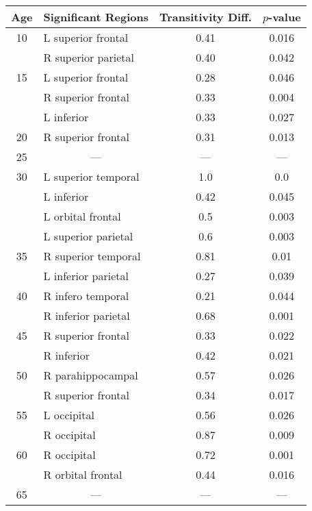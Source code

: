 \begin{table}[htb]
\centering
\begin{tabular}{c l c c}
\toprule
Age & \multicolumn{1}{c}{Significant Regions} & Transitivity Diff. & $p$-value\\
\midrule
\rowcolor{gray!40}
10 & L superior frontal & 0.41 & 0.016 \\
\rowcolor{gray!40}
{} & R superior parietal & 0.40 & 0.042 \\
\rowcolor{gray!20}
15 & L superior frontal & 0.28 & 0.046 \\
\rowcolor{gray!20}
{} & R superior frontal & 0.33 & 0.004 \\
\rowcolor{gray!20}
{} & L inferior & 0.33 & 0.027 \\
\rowcolor{gray!40}
20 & R superior frontal & 0.31 & 0.013 \\
\rowcolor{gray!20}
25 & \multicolumn{1}{c}{---} & --- & --- \\
\rowcolor{gray!40}
30 & L superior temporal & 1.0 & 0.0 \\
\rowcolor{gray!40}
{} & L inferior & 0.42 & 0.045 \\
\rowcolor{gray!40}
{} & L orbital frontal & 0.5 & 0.003 \\
\rowcolor{gray!40}
{} & L superior parietal & 0.6 & 0.003 \\
\rowcolor{gray!20}
35 & R superior temporal & 0.81 & 0.01 \\
\rowcolor{gray!20}
{} & L inferior parietal & 0.27 & 0.039 \\
\rowcolor{gray!40}
40 & R infero temporal & 0.21 & 0.044 \\
\rowcolor{gray!40}
{} & R inferior parietal & 0.68 & 0.001 \\
\rowcolor{gray!20}
45 & R superior frontal & 0.33 & 0.022 \\
\rowcolor{gray!20}
{} & R inferior & 0.42 & 0.021 \\
\rowcolor{gray!40}
50 & R parahippocampal & 0.57 & 0.026 \\
\rowcolor{gray!40}
{} & R superior frontal & 0.34 & 0.017 \\
\rowcolor{gray!20}
55 & L occipital & 0.56 & 0.026 \\
\rowcolor{gray!20}
{} & R occipital & 0.87 & 0.009 \\
\rowcolor{gray!40}
60 & R occipital & 0.72 & 0.001 \\
\rowcolor{gray!40}
{} & R orbital frontal & 0.44 & 0.016 \\
\rowcolor{gray!20}
65 & \multicolumn{1}{c}{---} & --- & --- \\

\end{tabular}
\end{table}
